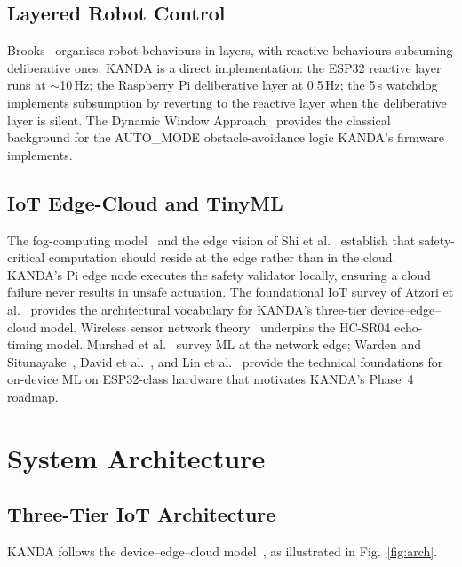 \documentclass[conference]{IEEEtran}
\begin{document}
\subsection{Layered Robot Control}

Brooks~\cite{brooks1986robust} organises robot behaviours in layers, with
reactive behaviours subsuming deliberative ones.
KANDA is a direct implementation: the ESP32 reactive layer runs at
$\sim$10\,Hz; the Raspberry Pi deliberative layer at 0.5\,Hz;
the 5\,s watchdog implements subsumption by reverting to the reactive
layer when the deliberative layer is silent.
The Dynamic Window Approach~\cite{fox1997dwa} provides the classical
background for the AUTO\_MODE obstacle-avoidance logic KANDA's firmware
implements.

\subsection{IoT Edge-Cloud and TinyML}

The fog-computing model~\cite{bonomi2012fog} and the edge vision of Shi et
al.~\cite{shi2016edge} establish that safety-critical computation should
reside at the edge rather than in the cloud.
KANDA's Pi edge node executes the safety validator locally, ensuring a
cloud failure never results in unsafe actuation.
The foundational IoT survey of Atzori et al.~\cite{atzori2010iot} provides
the architectural vocabulary for KANDA's three-tier device--edge--cloud model.
Wireless sensor network theory~\cite{akyildiz2002wsn} underpins the
HC-SR04 echo-timing model.
Murshed et al.~\cite{murshed2022edge} survey ML at the network edge;
Warden and Situnayake~\cite{warden2020tinyml}, David et al.~\cite{david2021tflitemicro},
and Lin et al.~\cite{lin2020mcunet} provide the technical foundations for
on-device ML on ESP32-class hardware that motivates KANDA's Phase~4 roadmap.

\section{System Architecture}
\label{sec:arch}

\subsection{Three-Tier IoT Architecture}

KANDA follows the device--edge--cloud model~\cite{bonomi2012fog, shi2016edge},
as illustrated in Fig.~\ref{fig:arch}.
\end{document}
